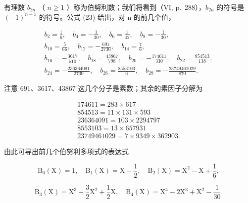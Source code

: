 有理数 \(b_{2n}\) （ \(n \geqslant 1\) ）称为伯努利数；我们将看到（VI, p.~288），\(b_{2n}\) 的符号是 \((-1)^{n-1}\) 的符号。公式 (23) 给出，对 n 的前几个值，

\[
\begin{array}{c} b _ {2} = \frac {1}{6}, \quad b _ {4} = - \frac {1}{3 0}, \quad b _ {6} = \frac {1}{4 2}, \quad b _ {8} = - \frac {1}{3 0}, \\ b _ {1 0} = \frac {5}{6 6}, \quad b _ {1 2} = - \frac {6 9 1}{2 7 3 0}, \quad b _ {1 4} = \frac {7}{6}, \\ b _ {1 6} = - \frac {3 6 1 7}{5 1 0}, \quad b _ {1 8} = \frac {4 3 8 6 7}{7 9 8}, \quad b _ {2 0} = - \frac {1 7 4 6 1 1}{3 3 0}, \quad b _ {2 2} = \frac {8 5 4 5 1 3}{1 3 8}, \\ b _ {2 4} = - \frac {2 3 6 3 6 4 0 9 1}{2 7 3 0}, \quad b _ {2 6} = \frac {8 5 5 3 1 0 3}{6}, \quad b _ {2 8} = - \frac {2 3 7 4 9 4 6 1 0 2 9}{8 7 0}. \end{array}
\]

注意 691、3617、43867 这几个分子是素数；其余的素因子分解为

\[
\begin{array}{c} 1 7 4 6 1 1 = 2 8 3 \times 6 1 7 \\ 8 5 4 5 1 3 = 1 1 \times 1 3 1 \times 5 9 3 \\ 2 3 6 3 6 4 0 9 1 = 1 0 3 \times 2 2 9 4 7 9 7 \\ 8 5 5 3 1 0 3 = 1 3 \times 6 5 7 9 3 1 \\ 2 3 7 4 9 4 6 1 0 2 9 = 7 \times 9 3 4 9 \times 3 6 2 9 0 3. \end{array}
\]

由此可导出前几个伯努利多项式的表达式

\[
\mathrm{B} _ {0} (\mathrm{X}) = 1, \quad \mathrm{B} _ {1} (\mathrm{X}) = \mathrm{X} - \frac {1}{2}, \quad \mathrm{B} _ {2} (\mathrm{X}) = \mathrm{X} ^ {2} - \mathrm{X} + \frac {1}{6},
\]

\[
\mathrm{B} _ {3} (\mathrm{X}) = \mathrm{X} ^ {3} - \frac {3}{2} \mathrm{X} ^ {2} + \frac {1}{2} \mathrm{X}, \quad \mathrm{B} _ {4} (\mathrm{X}) = \mathrm{X} ^ {4} - 2 \mathrm{X} ^ {3} + \mathrm{X} ^ {2} - \frac {1}{3 0}.
\]

